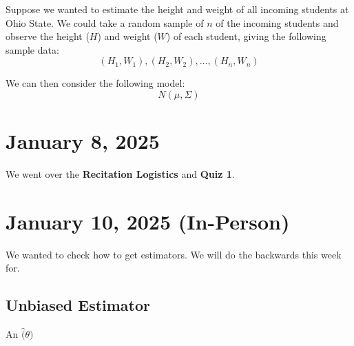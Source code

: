 \documentclass[11pt]{article}
\begin{document}
\begin{example}
    Suppose we wanted to estimate the height and weight of all incoming students at Ohio State. We could take a random sample of \(n\) of the incoming students and observe the height (\(H\)) and weight (\(W\)) of each student, giving the following sample data:
    \[
        (H_1, W_1), (H_2, W_2), \dots, (H_n, W_n)
    \]
\end{example}
We can then consider the following model:
\[
    {N(\mu, \Sigma)}
\]

\section{January 8, 2025}
We went over the \textbf{Recitation Logistics} and \textbf{Quiz 1}.

\section{January 10, 2025 (In-Person)}
We wanted to check how to get estimators. We will do the backwards this week for.

\subsection{Unbiased Estimator}
\begin{definition}
    An  \(\hat(\theta) \)
\end{definition}
\end{document}
